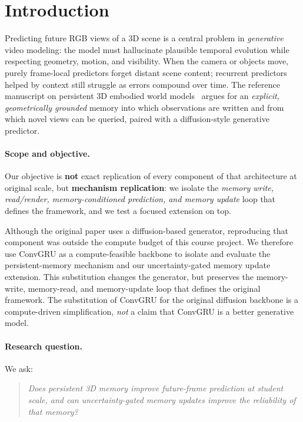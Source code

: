 \documentclass[11pt]{article}
\begin{document}
\section{Introduction}

Predicting future RGB views of a 3D scene is a central problem in \emph{generative} video modeling:
the model must hallucinate plausible temporal evolution while respecting geometry, motion, and
visibility.
When the camera or objects move, purely frame-local predictors forget distant scene content; recurrent
predictors helped by context still struggle as errors compound over time.
The reference manuscript on persistent 3D embodied world models~\cite{persistent3dworld} argues for an
\emph{explicit, geometrically grounded} memory into which observations are written and from which novel
views can be queried, paired with a diffusion-style generative predictor.

\paragraph{Scope and objective.}
Our objective is \textbf{not} exact replication of every component of that architecture at original scale,
but \textbf{mechanism replication}: we isolate the \emph{memory write, read/render, memory-conditioned
prediction, and memory update} loop that defines the framework, and we test a focused extension on top.

Although the original paper uses a diffusion-based generator, reproducing that component was outside the
compute budget of this course project. We therefore use ConvGRU as a compute-feasible backbone to
isolate and evaluate the persistent-memory mechanism and our uncertainty-gated memory update extension.
This substitution changes the generator, but preserves the memory-write, memory-read, and memory-update
loop that defines the original framework.
The substitution of ConvGRU for the original diffusion backbone is a compute-driven simplification, \emph{not}
a claim that ConvGRU is a better generative model.

\paragraph{Research question.}
We ask:
\begin{quote}
\emph{Does persistent 3D memory improve future-frame prediction at student scale, and can
uncertainty-gated memory updates improve the reliability of that memory?}
\end{quote}
\end{document}
